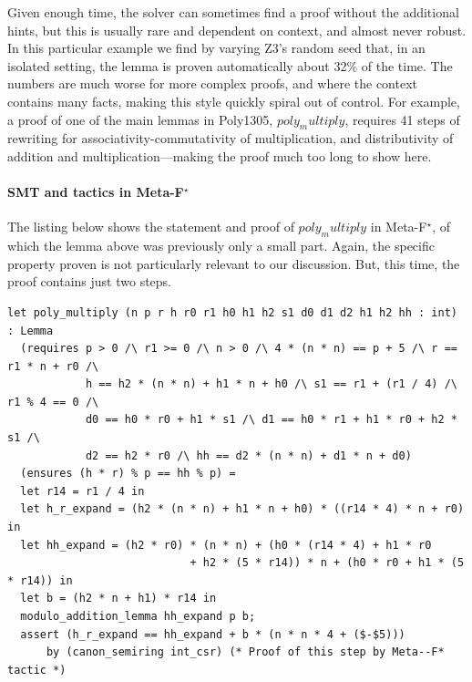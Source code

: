 \documentclass[runningheads]{llncs}
\newcommand\metafstar{Meta-F$^\star$\xspace}
\newcommand{\comm}[3]{\ifcheckpagebudget\else\ifdraft{{\color{#1}[#2: #3]}}\fi\fi}
\newcommand{\ch}[1]{\comm{teal}{CH}{#1}}
\newcommand{\guido}[1]{\comm{blue}{Guido}{#1}}
\begin{document}
Given enough time, the solver can sometimes find a proof without 
the additional hints, but this is usually rare and dependent on context,
and almost never robust.
%
In this particular example we find by varying Z3's random
seed that, in an isolated setting,
the lemma is proven automatically about 32\% of the time.
%
%
The numbers are much worse for more complex proofs, and where the
context contains many facts, making this style quickly spiral out of
control.
%
For example, a proof of one of the main lemmas in
Poly1305, \ls$poly_multiply$, requires 41 steps of rewriting for
associativity-commutativity of multiplication, and
distributivity of addition and multiplication---making the proof
much too long to show here.
%


\paragraph{\bf SMT and tactics in \metafstar}

\label{sec:canon_semiring}
\label{sec:poly_multiply}

The listing below shows the statement and proof of \ls$poly_multiply$
in \metafstar, of which the lemma above was previously only a small part.
Again, the specific property proven is not particularly
relevant to our discussion. But, this time, the proof contains just
two steps.
%
\begin{lstlisting}
let poly_multiply (n p r h r0 r1 h0 h1 h2 s1 d0 d1 d2 h1 h2 hh : int) : Lemma
  (requires p > 0 /\ r1 >= 0 /\ n > 0 /\ 4 * (n * n) == p + 5 /\ r == r1 * n + r0 /\
            h == h2 * (n * n) + h1 * n + h0 /\ s1 == r1 + (r1 / 4) /\ r1 % 4 == 0 /\
            d0 == h0 * r0 + h1 * s1 /\ d1 == h0 * r1 + h1 * r0 + h2 * s1 /\
            d2 == h2 * r0 /\ hh == d2 * (n * n) + d1 * n + d0)
  (ensures (h * r) % p == hh % p) =
  let r14 = r1 / 4 in
  let h_r_expand = (h2 * (n * n) + h1 * n + h0) * ((r14 * 4) * n + r0) in
  let hh_expand = (h2 * r0) * (n * n) + (h0 * (r14 * 4) + h1 * r0
                            + h2 * (5 * r14)) * n + (h0 * r0 + h1 * (5 * r14)) in
  let b = (h2 * n + h1) * r14 in
  modulo_addition_lemma hh_expand p b;
  assert (h_r_expand == hh_expand + b * (n * n * 4 + ($-$5)))
      by (canon_semiring int_csr) (* Proof of this step by Meta--F* tactic *)
\end{lstlisting}
\end{document}
